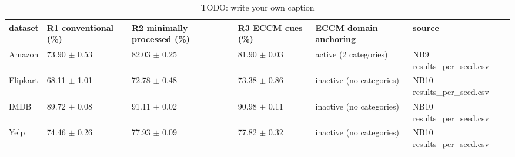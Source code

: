 \begin{table}
\caption{TODO: write your own caption}\label{tab:T01-preprocessing-macroF1}
\scriptsize
\begin{tabularx}{\textheight}{lllll>{\raggedright\arraybackslash}X}
\toprule
dataset & R1 conventional (\%) & R2 minimally processed (\%) & R3 ECCM cues (\%) & ECCM domain anchoring & source \\
\midrule
Amazon & 73.90 $\pm$ 0.53 & 82.03 $\pm$ 0.25 & 81.90 $\pm$ 0.03 & active (2 categories) & NB9 results\_\allowbreak{}per\_\allowbreak{}seed.csv \\
Flipkart & 68.11 $\pm$ 1.01 & 72.78 $\pm$ 0.48 & 73.38 $\pm$ 0.86 & inactive (no categories) & NB10 results\_\allowbreak{}per\_\allowbreak{}seed.csv \\
IMDB & 89.72 $\pm$ 0.08 & 91.11 $\pm$ 0.02 & 90.98 $\pm$ 0.11 & inactive (no categories) & NB10 results\_\allowbreak{}per\_\allowbreak{}seed.csv \\
Yelp & 74.46 $\pm$ 0.26 & 77.93 $\pm$ 0.09 & 77.82 $\pm$ 0.32 & inactive (no categories) & NB10 results\_\allowbreak{}per\_\allowbreak{}seed.csv \\
\bottomrule
\end{tabularx}
\end{table}
